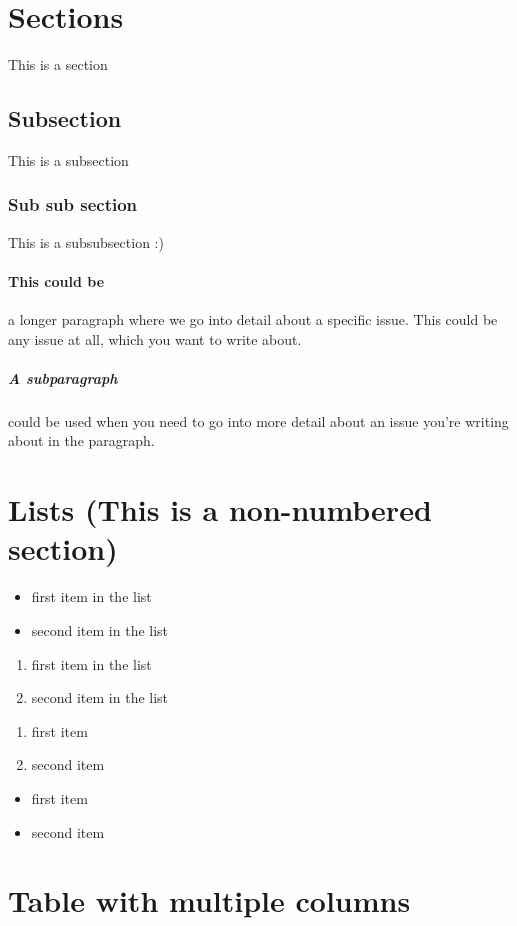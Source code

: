 \documentclass{report}
\begin{document}
\section{Sections}
This is a section
\subsection{Subsection}
This is a subsection
\subsubsection{Sub sub section}
This is a subsubsection :)
\paragraph{This could be}
 a longer paragraph where we go into detail about a specific issue. This could be any issue at all, which you want to write about.
 \subparagraph{A subparagraph} could be used when you need to go into more detail about an issue you're writing about in the paragraph.
\section*{Lists (This is a non-numbered section)}
\begin{itemize}
	\item first item in the list
	\item second item in the list
\end{itemize}

\begin{enumerate}
	\item first item in the list
	\item second item in the list
\end{enumerate}
\renewcommand{\labelenumi}{\Roman{enumi}}
\begin{enumerate}
	\item first item
	\item second item
\end{enumerate}

\renewcommand{\labelitemi}{$\textasteriskcentered$}
\begin{itemize}
 	\item first item
 	\item second item
\end{itemize}
\section{Table with multiple columns}
\end{document}
